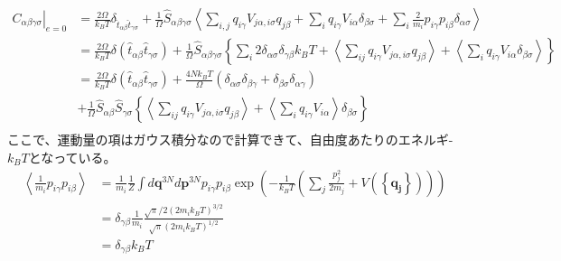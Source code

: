\documentclass[11pt,a4paper,uplatex]{jsarticle}
\begin{document}
\begin{align}
    \left. C_{\alpha \beta \gamma \sigma} \right|_{e=0} &= \frac{2\Omega}{k_{B} T} \delta_{\hat{t}_{\alpha \beta} \hat{t}_{\gamma \sigma}}
     + \frac{1}{\Omega} \hat{S}_{\alpha \beta \gamma \sigma} \left< 
    \sum_{i, j} q_{i \gamma} V_{j\alpha, i\sigma} q_{j \beta}
     + \sum_{i} q_{i \gamma} V_{i \alpha} \delta_{\beta \sigma}
     + \sum_{i} \frac{2}{m_{i}} p_{i \gamma} p_{i \beta} \delta_{\alpha \sigma} 
    \right> \\
    &= \frac{2\Omega}{k_{B}T} \delta(\hat{t}_{\alpha \beta} \hat{t}_{\gamma \sigma}) 
    + \frac{1}{\Omega} \hat{S}_{\alpha \beta \gamma \sigma} \left\{ 
        \sum_{i} 2\delta_{\alpha \sigma} \delta_{\gamma \beta} k_{B} T
         + \left< \sum_{ij} q_{i \gamma} V_{j \alpha, i \sigma} q_{j \beta}  \right>
         + \left< \sum_{i} q_{i \gamma} V_{i \alpha} \delta_{\beta \sigma} \right>
         \right\} \\
    &= \frac{2\Omega}{k_{B}T} \delta(\hat{t}_{\alpha \beta} \hat{t}_{\gamma \sigma})
           + \frac{4Nk_{B}T}{\Omega}\left( \delta_{\alpha \sigma} \delta_{\beta \gamma} + \delta_{\beta \sigma}\delta_{\alpha \gamma} \right) \\
    &      + \frac{1}{\Omega} \hat{S}_{\alpha \beta} \hat{S}_{\gamma \sigma}\left\{ 
           \left< \sum_{ij} q_{i \gamma} V_{j \alpha, i \sigma} q_{j \beta}  \right>
          + \left< \sum_{i} q_{i \gamma} V_{i \alpha}\right> \delta_{\beta \sigma} 
          \right\} \\
\end{align}
ここで、運動量の項はガウス積分なので計算できて、自由度あたりのエネルギ-$k_{B}T$となっている。
\begin{align}
    \left< \frac{1}{m_{i}} p_{i \gamma} p_{i \beta} \right> &= \frac{1}{m_{i}} \frac{1}{Z} \int d\bm{q}^{3N} d\bm{p}^{3N} p_{i \gamma} p_{i \beta} \exp\left(-\frac{1}{k_{B}T}\left( \sum_{j}\frac{p_{j}^{2}}{2m_{j}} + V\left(\left\{\bm{q_{j}}\right\}\right)\right) \right) \\
    &= \delta_{\gamma \beta} \frac{1}{m_{i}} \frac{\sqrt{\pi}/2 (2m_{i}k_{B}T)^{3/2}}{\sqrt{\pi} (2 m_{i}k_{B}T)^{1/2}}\\
    &= \delta_{\gamma \beta} k_{B} T
\end{align}
\end{document}
